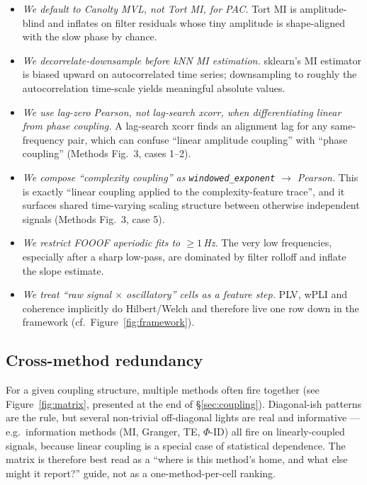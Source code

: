 \documentclass[11pt,a4paper]{article}
\begin{document}
\begin{itemize}
  \item \emph{We default to Canolty MVL, not Tort MI, for PAC.}
        Tort MI is amplitude-blind and inflates on filter residuals
        whose tiny amplitude is shape-aligned with the slow phase by
        chance.
  \item \emph{We decorrelate-downsample before kNN MI estimation.}
        sklearn's MI estimator is biased upward on autocorrelated
        time series; downsampling to roughly the autocorrelation
        time-scale yields meaningful absolute values.
  \item \emph{We use lag-zero Pearson, not lag-search xcorr, when
        differentiating linear from phase coupling.} A lag-search
        xcorr finds an alignment lag for any same-frequency pair,
        which can confuse ``linear amplitude coupling'' with ``phase
        coupling'' (Methods Fig.~3, cases 1--2).
  \item \emph{We compose ``complexity coupling'' as
        \texttt{windowed\_exponent} $\to$ Pearson.} This is exactly
        ``linear coupling applied to the complexity-feature trace'',
        and it surfaces shared time-varying scaling structure between
        otherwise independent signals (Methods Fig.~3, case 5).
  \item \emph{We restrict FOOOF aperiodic fits to $\geq 1$\,Hz.}
        The very low frequencies, especially after a sharp low-pass,
        are dominated by filter rolloff and inflate the slope estimate.
  \item \emph{We treat ``raw signal $\times$ oscillatory''
        cells as a feature step.} PLV, wPLI and coherence implicitly
        do Hilbert/Welch and therefore live one row down in the
        framework (cf.\ Figure~\ref{fig:framework}).
\end{itemize}

\subsection{Cross-method redundancy}

For a given coupling structure, multiple methods often fire together
(see Figure~\ref{fig:matrix}, presented at the end of
\S\ref{sec:coupling}). Diagonal-ish patterns are the rule, but several
non-trivial off-diagonal lights are real and informative --- e.g.\
information methods (\textsc{MI}, Granger, TE, $\Phi$-ID) all fire on
linearly-coupled signals, because linear coupling is a special case of
statistical dependence. The matrix is therefore best read as a ``where
is this method's home, and what else might it report?'' guide, not as
a one-method-per-cell ranking.
\end{document}
